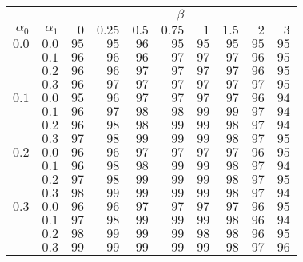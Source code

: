 \begin{tabular}{rr|rrrrrrrr}
\hline\hline
 && \multicolumn{8}{c}{$\beta$}\\
 $\alpha_0$ & $\alpha_1$ & $0$ & $0.25$ & $0.5$ & $0.75$ & $1$ & $1.5$ & $2$ & $3$ \\ 
 \hline
$0.0$ & $0.0$ & $95$ & $95$ & $96$ & $95$ & $95$ & $95$ & $95$ & $95$\\ 
 & $0.1$ & $96$ & $96$ & $96$ & $97$ & $97$ & $97$ & $96$ & $95$\\ 
 & $0.2$ & $96$ & $96$ & $97$ & $97$ & $97$ & $97$ & $96$ & $95$\\ 
 & $0.3$ & $96$ & $97$ & $97$ & $97$ & $97$ & $97$ & $97$ & $95$\\ 
\hline 
 $0.1$ & $0.0$ & $95$ & $96$ & $97$ & $97$ & $97$ & $97$ & $96$ & $94$\\ 
 & $0.1$ & $96$ & $97$ & $98$ & $98$ & $99$ & $99$ & $97$ & $94$\\ 
 & $0.2$ & $96$ & $98$ & $98$ & $99$ & $99$ & $98$ & $97$ & $94$\\ 
 & $0.3$ & $97$ & $98$ & $99$ & $99$ & $99$ & $98$ & $97$ & $95$\\ 
\hline 
 $0.2$ & $0.0$ & $96$ & $96$ & $97$ & $97$ & $97$ & $97$ & $96$ & $95$\\ 
 & $0.1$ & $96$ & $98$ & $98$ & $99$ & $99$ & $98$ & $97$ & $94$\\ 
 & $0.2$ & $97$ & $98$ & $99$ & $99$ & $99$ & $98$ & $97$ & $95$\\ 
 & $0.3$ & $98$ & $99$ & $99$ & $99$ & $99$ & $98$ & $97$ & $94$\\ 
\hline 
 $0.3$ & $0.0$ & $96$ & $96$ & $97$ & $97$ & $97$ & $97$ & $96$ & $95$\\ 
 & $0.1$ & $97$ & $98$ & $99$ & $99$ & $99$ & $98$ & $96$ & $94$\\ 
 & $0.2$ & $98$ & $99$ & $99$ & $99$ & $98$ & $98$ & $96$ & $95$\\ 
 & $0.3$ & $99$ & $99$ & $99$ & $99$ & $99$ & $98$ & $97$ & $96$\\ 
 \hline 
 \end{tabular}